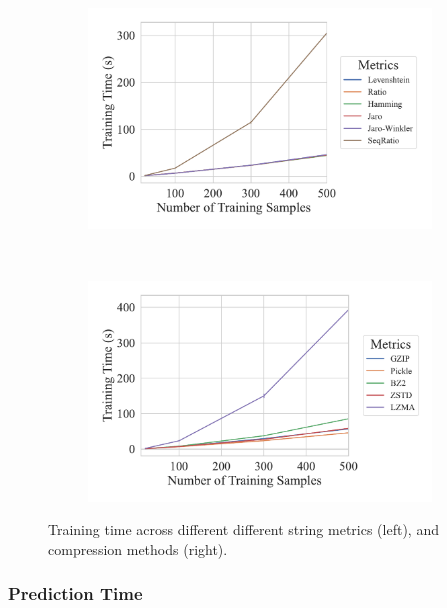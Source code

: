 \begin{figure}
	\begin{subfigure}
		\centering
		\includegraphics[width=.46\textwidth]{figs/truthseeker/string_metric_vs_train_time.pdf}
	\end{subfigure}
	~
	\begin{subfigure}
		\centering
		\includegraphics[width=.46\textwidth]{figs/truthseeker/compressor_metric_vs_train_time.pdf}
	\end{subfigure}
	\caption{Training time across different different string  metrics (left), and compression methods (right).}
	\label{fig:training_time}
\end{figure}

\subsubsection{Prediction Time}

